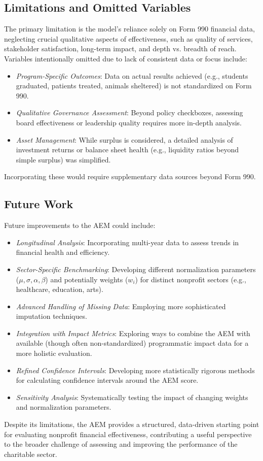 \documentclass[12pt]{article}
\begin{document}
\subsection{Limitations and Omitted Variables} %
The primary limitation is the model's reliance solely on Form 990 financial data, neglecting crucial qualitative aspects of effectiveness, such as quality of services, stakeholder satisfaction, long-term impact, and depth vs. breadth of reach. Variables intentionally omitted due to lack of consistent data or focus include:
\begin{itemize}
    \item \textit{Program-Specific Outcomes}: Data on actual results achieved (e.g., students graduated, patients treated, animals sheltered) is not standardized on Form 990.
    \item \textit{Qualitative Governance Assessment}: Beyond policy checkboxes, assessing board effectiveness or leadership quality requires more in-depth analysis.
    \item \textit{Asset Management}: While surplus is considered, a detailed analysis of investment returns or balance sheet health (e.g., liquidity ratios beyond simple surplus) was simplified.
\end{itemize}
Incorporating these would require supplementary data sources beyond Form 990.

\subsection{Future Work} %
Future improvements to the AEM could include:
\begin{itemize}
    \item \textit{Longitudinal Analysis}: Incorporating multi-year data to assess trends in financial health and efficiency.
    \item \textit{Sector-Specific Benchmarking}: Developing different normalization parameters ($\mu, \sigma, \alpha, \beta$) and potentially weights ($w_i$) for distinct nonprofit sectors (e.g., healthcare, education, arts).
    \item \textit{Advanced Handling of Missing Data}: Employing more sophisticated imputation techniques.
    \item \textit{Integration with Impact Metrics}: Exploring ways to combine the AEM with available (though often non-standardized) programmatic impact data for a more holistic evaluation.
    \item \textit{Refined Confidence Intervals}: Developing more statistically rigorous methods for calculating confidence intervals around the AEM score.
    \item \textit{Sensitivity Analysis}: Systematically testing the impact of changing weights and normalization parameters.
\end{itemize}
Despite its limitations, the AEM provides a structured, data-driven starting point for evaluating nonprofit financial effectiveness, contributing a useful perspective to the broader challenge of assessing and improving the performance of the charitable sector.
\end{document}
